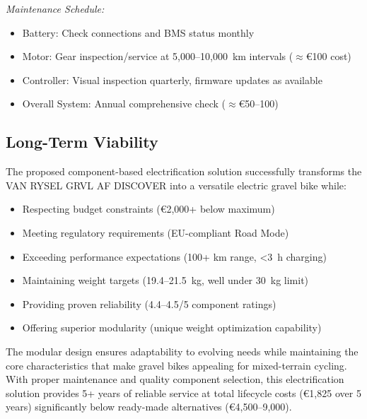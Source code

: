 \documentclass[12pt,a4paper]{article}
\begin{document}
\textit{Maintenance Schedule:}
\begin{itemize}
    \item Battery: Check connections and BMS status monthly
    \item Motor: Gear inspection/service at 5,000--10,000~km intervals ($\approx$€100 cost)
    \item Controller: Visual inspection quarterly, firmware updates as available
    \item Overall System: Annual comprehensive check ($\approx$€50--100)
\end{itemize}

\subsection{Long-Term Viability}

The proposed component-based electrification solution successfully transforms the VAN RYSEL GRVL AF DISCOVER into a versatile electric gravel bike while:
\begin{itemize}
    \item Respecting budget constraints (€2,000+ below maximum)
    \item Meeting regulatory requirements (EU-compliant Road Mode)
    \item Exceeding performance expectations (100+ km range, <3~h charging)
    \item Maintaining weight targets (19.4--21.5~kg, well under 30~kg limit)
    \item Providing proven reliability (4.4--4.5/5 component ratings)
    \item Offering superior modularity (unique weight optimization capability)
\end{itemize}

The modular design ensures adaptability to evolving needs while maintaining the core characteristics that make gravel bikes appealing for mixed-terrain cycling. With proper maintenance and quality component selection, this electrification solution provides 5+ years of reliable service at total lifecycle costs (€1,825 over 5 years) significantly below ready-made alternatives (€4,500--9,000).
\end{document}
